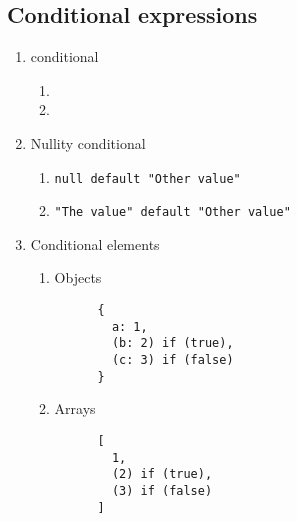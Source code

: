 \subsection{Conditional expressions}
\begin{enumerate}[resume*]
\item {} conditional
  \begin{enumerate}
  \item {}
  \item {}
  \end{enumerate}
\item Nullity conditional
  \begin{enumerate}
  \item \lstinline{null default "Other value"}
  \item \lstinline{"The value" default "Other value"}
  \end{enumerate}
\item Conditional elements
  \begin{enumerate}
  \item Objects
    \begin{lstlisting}
      {
        a: 1,
        (b: 2) if (true),
        (c: 3) if (false)
      }
    \end{lstlisting}
  \item Arrays
    \begin{lstlisting}
      [
        1, 
        (2) if (true),
        (3) if (false)
      ]
    \end{lstlisting}
  \end{enumerate}
\end{enumerate}
